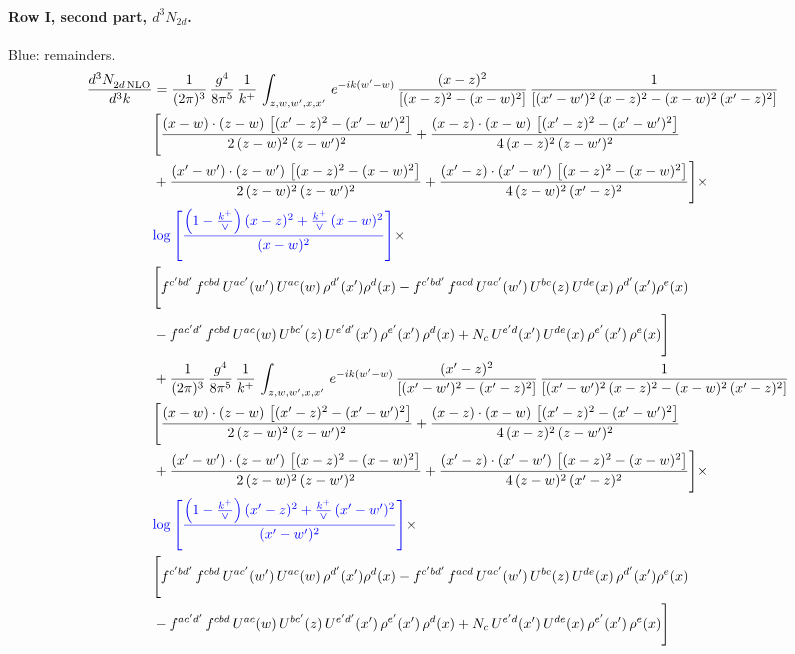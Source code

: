 \documentclass[10pt]{article}
\numberwithin{equation}{section}
\newcommand{\new}[1]{{\color{blue}#1}}
\begin{document}
\paragraph{Row I, second part, $d^3N_{2d}$.}
\new{Blue}: remainders.
\begin{align}
 \frac{d^{3}N_{2d\,\rm NLO}^{\rm}}{d^{3}k}  & =  \frac{1}{(2\pi)^{3}}\, \frac{g^{4}}{8\pi^{5}}\,\frac{1}{k^{+}}\,\int_{z,w,w^{\prime},x,x'}\, e^{-ik(w^{\prime}-w)}\,\frac{(x-z)^{2}}{\left[(x-z)^{2}-(x-w)^{2}\right]}\,\frac{1}{\left[(x'-w')^{2}\,(x-z)^{2} - (x-w)^{2}\,(x'-z)^{2}\right]}\notag \\ & \Bigg[\frac{(x-w)\cdot (z-w)\, \left[(x'-z)^{2}-(x'-w')^{2}\right]}{2\, (z-w)^{2}\, (z-w')^{2}}  + \frac{(x-z)\cdot (x-w)\,\left[(x'-z)^{2}-(x'-w')^{2}\right] }{4\,(x-z)^{2}\,(z-w')^{2}}\notag \\ & +\frac{(x'-w')\cdot (z-w')\, \left[(x-z)^{2}-(x-w)^{2}\right]}{2\, (z-w)^{2}\, (z-w')^{2}}+ \frac{(x'-z)\cdot (x'-w')\, \left[(x-z)^{2}-(x-w)^{2}\right]}{4\, (z-w)^{2}\,(x'-z)^{2}}\Bigg]\times\,\notag \\ & \new{\log{\left[\frac{\left(1-\frac{k^{+}}{\vee}\right)(x-z)^{2}+\frac{k^{+}}{\vee}\,(x-w)^{2}}{(x-w)^{2}}\right]}} \times\notag \\ & \Bigg[f^{c'bd'}\,f^{cbd}\, U^{ac'}(w')\,U^{ac}(w)\,\rho^{d'}(x')\rho^{d}(x)- f^{c'bd'}\,f^{acd}\,U^{ac'}(w')\,U^{bc}(z)\,U^{de}(x)\,\rho^{d'}(x')\rho^{e}(x) \notag \\ & -f^{ac'd'}\,f^{cbd}\,U^{ac}(w)\,U^{bc'}(z)\,U^{e'd'}(x')\,\rho^{e'}(x')\,\rho^{d}(x) +N_{c}\,U^{e'd}(x')\,U^{de}(x)\,\rho^{e'}(x')\,\rho^{e}(x)\Bigg] \notag \\
& +\frac{1}{(2\pi)^{3}}\, \frac{g^{4}}{8\pi^{5}}\,\frac{1}{k^{+}}\,\int_{z,w,w^{\prime},x,x'}\, e^{-ik(w^{\prime}-w)}\,\frac{(x'-z)^{2}}{\left[(x'-w')^{2}-(x'-z)^{2}\right]}\,\frac{1}{\left[(x'-w')^{2}\,(x-z)^{2} - (x-w)^{2}\,(x'-z)^{2}\right]}\notag \\ & \Bigg[\frac{(x-w)\cdot (z-w)\, \left[(x'-z)^{2}-(x'-w')^{2}\right]}{2\, (z-w)^{2}\, (z-w')^{2}}  + \frac{(x-z)\cdot (x-w)\,\left[(x'-z)^{2}-(x'-w')^{2}\right] }{4\,(x-z)^{2}\,(z-w')^{2}}\notag \\ & +\frac{(x'-w')\cdot (z-w')\, \left[(x-z)^{2}-(x-w)^{2}\right]}{2\, (z-w)^{2}\, (z-w')^{2}}+ \frac{(x'-z)\cdot (x'-w')\, \left[(x-z)^{2}-(x-w)^{2}\right]}{4\, (z-w)^{2}\,(x'-z)^{2}}\Bigg]\times\,\notag \\ & \new{\log{\left[\frac{\left(1-\frac{k^{+}}{\vee}\right)(x'-z)^{2}+\frac{k^{+}}{\vee}\,(x'-w')^{2}}{(x'-w')^{2}}\right]}} \times\notag \\ & \Bigg[f^{c'bd'}\,f^{cbd}\, U^{ac'}(w')\,U^{ac}(w)\,\rho^{d'}(x')\rho^{d}(x)- f^{c'bd'}\,f^{acd}\,U^{ac'}(w')\,U^{bc}(z)\,U^{de}(x)\,\rho^{d'}(x')\rho^{e}(x) \notag \\ & -f^{ac'd'}\,f^{cbd}\,U^{ac}(w)\,U^{bc'}(z)\,U^{e'd'}(x')\,\rho^{e'}(x')\,\rho^{d}(x) +N_{c}\,U^{e'd}(x')\,U^{de}(x)\,\rho^{e'}(x')\,\rho^{e}(x)\Bigg] \label{eq:F:G2I2d}
\end{align}
\end{document}
